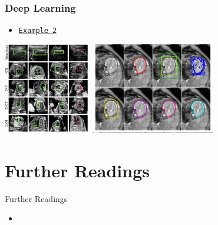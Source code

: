 \begin{frame}
    \frametitle{Deep Learning}
    \begin{itemize}
        \item \href{https://www.youtube.com/watch?v=4V8V0jF0zFc}{\texttt{Example 2}}
        \end{itemize}
        \begin{center}
    \includegraphics[height=4cm]{img/ultrasound.png}
    \includegraphics[height=4cm]{img/fetal.png}
     \end{center}
\end{frame}



\section{Further Readings}%
\label{sec:further_readings}


\begin{frame}[t]{Further Readings}
    \begin{itemize}
        \item {}
    \end{itemize}
\end{frame}



